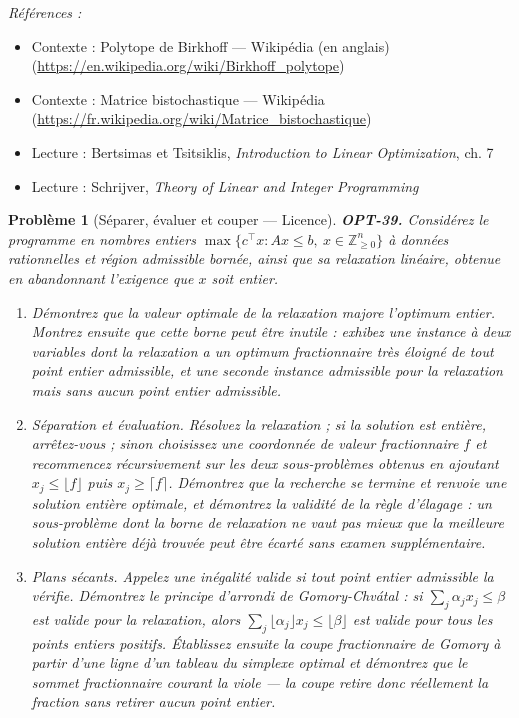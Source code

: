 \documentclass[11pt]{article}
\newtheorem{problem}{Problème}
\newenvironment{refs}{\par\small\noindent\emph{Références :}\begin{itemize}\setlength\itemsep{0pt}}{\end{itemize}\normalsize}
\begin{document}
\begin{refs}
\item Contexte : Polytope de Birkhoff --- Wikipédia (en anglais) (\url{https://en.wikipedia.org/wiki/Birkhoff_polytope})
\item Contexte : Matrice bistochastique --- Wikipédia (\url{https://fr.wikipedia.org/wiki/Matrice_bistochastique})
\item Lecture : Bertsimas et Tsitsiklis, \textit{Introduction to Linear Optimization}, ch. 7
\item Lecture : Schrijver, \textit{Theory of Linear and Integer Programming}
\end{refs}

\bigskip

\begin{problem}[{Séparer, évaluer et couper --- Licence}]
\textbf{OPT-39.} Considérez le programme en nombres entiers $\max\{c^{\top}x : Ax \le b,\ x \in \mathbb{Z}^n_{\ge 0}\}$ à données rationnelles et région admissible bornée, ainsi que sa relaxation linéaire, obtenue en abandonnant l'exigence que $x$ soit entier.
\begin{enumerate}
\item[(a)] Démontrez que la valeur optimale de la relaxation majore l'optimum entier. Montrez ensuite que cette borne peut être inutile : exhibez une instance à deux variables dont la relaxation a un optimum fractionnaire très éloigné de tout point entier admissible, et une seconde instance admissible pour la relaxation mais sans aucun point entier admissible.
\item[(b)] Séparation et évaluation. Résolvez la relaxation ; si la solution est entière, arrêtez-vous ; sinon choisissez une coordonnée de valeur fractionnaire $f$ et recommencez récursivement sur les deux sous-problèmes obtenus en ajoutant $x_j \le \lfloor f \rfloor$ puis $x_j \ge \lceil f \rceil$. Démontrez que la recherche se termine et renvoie une solution entière optimale, et démontrez la validité de la règle d'élagage : un sous-problème dont la borne de relaxation ne vaut pas mieux que la meilleure solution entière déjà trouvée peut être écarté sans examen supplémentaire.
\item[(c)] Plans sécants. Appelez une inégalité \textit{valide} si tout point entier admissible la vérifie. Démontrez le principe d'arrondi de Gomory-Chvátal : si $\sum_j \alpha_j x_j \le \beta$ est valide pour la relaxation, alors $\sum_j \lfloor \alpha_j \rfloor x_j \le \lfloor \beta \rfloor$ est valide pour tous les points entiers positifs. Établissez ensuite la coupe fractionnaire de Gomory à partir d'une ligne d'un tableau du simplexe optimal et démontrez que le sommet fractionnaire courant la viole --- la coupe retire donc réellement la fraction sans retirer aucun point entier.

\end{enumerate}
\end{problem}
\end{document}
